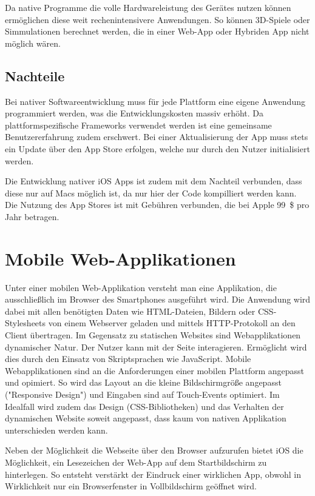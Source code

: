 Da native Programme die volle Hardwareleistung des Gerätes nutzen können ermöglichen diese weit rechenintensivere Anwendungen. So können 3D-Spiele oder Simmulationen berechnet werden, die in einer Web-App oder Hybriden App nicht möglich wären.
%
\subsection{Nachteile}
%
Bei nativer Softwareentwicklung muss für jede Plattform eine eigene Anwendung programmiert werden, was die Entwicklungskosten massiv erhöht. Da plattformspezifische Frameworks verwendet werden ist eine gemeinsame Benutzererfahrung zudem erschwert. Bei einer Aktualisierung der App muss stets ein Update über den App Store erfolgen, welche nur durch den Nutzer initialisiert werden.

Die Entwicklung nativer iOS Apps ist zudem mit dem Nachteil verbunden, dass diese nur auf Macs möglich ist, da nur hier der Code kompilliert werden kann. Die Nutzung des App Stores ist mit Gebühren verbunden, die bei Apple 99~\$ pro Jahr betragen. 
%
%
\section{Mobile Web-Applikationen}
\label{mobileWebApplikationen}
%
Unter einer mobilen Web-Applikation versteht man eine Applikation, die ausschließlich im Browser des Smartphones ausgeführt wird. Die Anwendung wird dabei mit allen benötigten Daten wie HTML-Dateien, Bildern oder CSS-Stylesheets von einem Webserver geladen und  mittels HTTP-Protokoll an den Client übertragen. Im Gegensatz zu statischen Websites sind Webapplikationen dynamischer Natur. Der Nutzer kann mit der Seite interagieren. Ermöglicht wird dies durch den Einsatz von Skriptsprachen wie JavaScript. Mobile Webapplikationen sind an die Anforderungen einer mobilen Plattform angepasst und opimiert. So wird das Layout an die kleine Bildschirmgröße angepasst ("Responsive Design") und Eingaben sind auf Touch-Events optimiert. Im Idealfall wird zudem das Design (CSS-Bibliotheken) und das Verhalten der dynamischen Website soweit angepasst, dass kaum von nativen Applikation unterschieden werden kann. 

Neben der Möglichkeit die Webseite über den Browser aufzurufen bietet iOS die Möglichkeit, ein Lesezeichen der Web-App auf dem Startbildschirm zu hinterlegen. So entsteht verstärkt der Eindruck einer wirklichen App, obwohl in Wirklichkeit nur ein Browserfenster in Vollbildschirm geöffnet wird. \cite{safariRef}
%
